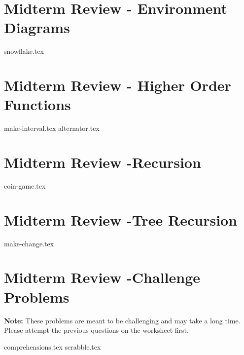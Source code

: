 \documentclass{exam}
\begin{document}
\newpage
\section{Midterm Review - Environment Diagrams}
\begin{questions}
{snowflake.tex}
\end{questions}

\newpage
\section{Midterm Review - Higher Order Functions}
\begin{questions}
{make-interval.tex}
{alternator.tex}
\end{questions}

\section{Midterm Review -Recursion}
\begin{questions}
{coin-game.tex}
\end{questions}

\section{Midterm Review -Tree Recursion}
\begin{questions}
{make-change.tex}
\end{questions}

\newpage
\section{Midterm Review -Challenge Problems}
\textbf{Note:} These problems are meant to be challenging and may take a long time. Please attempt the previous questions on the worksheet first.
\begin{questions}
{comprehensions.tex}
\newpage
{scrabble.tex}
\end{questions}
\end{document}
